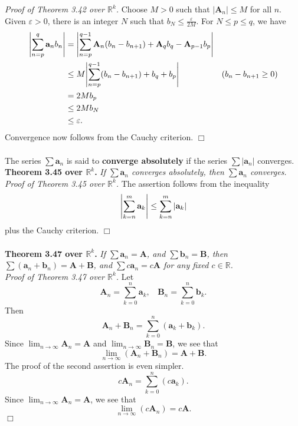 \documentclass{article}
\begin{document}
\emph{Proof of Theorem 3.42 over $\mathbb{R}^k$.}
Choose $M > 0$ such that $|\mathbf{A}_n| \leq M$ for all $n$.
Given $\varepsilon > 0$, there is an integer $N$ such that $b_N \leq \frac{\varepsilon}{2M}$.
For $N \leq p \leq q$, we have
\begin{align*}
  \abs{ \sum_{n=p}^{q} \mathbf{a}_n b_n }
  &= \abs{ \sum_{n=p}^{q-1} \mathbf{A}_n(b_n - b_{n+1})
    + \mathbf{A}_q b_q - \mathbf{A}_{p-1} b_p} \\
  &\leq M \abs{ \sum_{n=p}^{q-1} (b_n - b_{n+1})
    + b_q + b_p}
    &(b_n - b_{n+1} \geq 0) \\
  &= 2Mb_p \\
  &\leq 2Mb_N \\
  &\leq \varepsilon.
\end{align*}
Convergence now follows from the Cauchy criterion.
$\Box$ \\\\



The series $\sum \mathbf{a}_n$ is said to \textbf{converge absolutely}
if the series $\sum |\mathbf{a}_n|$ converges. \\

\textbf{Theorem 3.45 over $\mathbb{R}^k$.}
\emph{If $\sum \mathbf{a}_n$ converges absolutely,
then $\sum \mathbf{a}_n$ converges.} \\

\emph{Proof of Theorem 3.45 over $\mathbb{R}^k$.}
The assertion follows from the inequality
\[
  \abs{ \sum_{k=n}^{m} \mathbf{a}_k } \leq \sum_{k=n}^{m} |\mathbf{a}_k|
\]
plus the Cauchy criterion.
$\Box$ \\\\



\textbf{Theorem 3.47 over $\mathbb{R}^k$.}
\emph{If $\sum \mathbf{a}_n = \mathbf{A}$, and $\sum \mathbf{b}_n = \mathbf{B}$,
then $\sum (\mathbf{a}_n+\mathbf{b}_n) = \mathbf{A}+\mathbf{B}$,
and $\sum c\mathbf{a}_n = c\mathbf{A}$ for any fixed $c \in \mathbb{R}$.} \\

\emph{Proof of Theorem 3.47 over $\mathbb{R}^k$.}
Let
\[
  \mathbf{A}_n = \sum_{k=0}^{n} \mathbf{a}_k, \:\:\:\:
  \mathbf{B}_n = \sum_{k=0}^{n} \mathbf{b}_k.
\]
Then
\[
  \mathbf{A}_n + \mathbf{B}_n = \sum_{k=0}^{n} (\mathbf{a}_k+\mathbf{b}_k).
\]
Since
$\lim_{n \to \infty} \mathbf{A}_n = \mathbf{A}$ and
$\lim_{n \to \infty} \mathbf{B}_n = \mathbf{B}$, we see that
\[
  \lim_{n \to \infty} (\mathbf{A}_n+\mathbf{B}_n) = \mathbf{A}+\mathbf{B}.
\]
The proof of the second assertion is even simpler.
\[
  c\mathbf{A}_n = \sum_{k=0}^{n} (c\mathbf{a}_k).
\]
Since
$\lim_{n \to \infty} \mathbf{A}_n = \mathbf{A}$, we see that
\[
  \lim_{n \to \infty} (c\mathbf{A}_n) = c\mathbf{A}.
\]
$\Box$ \\\\
\end{document}
